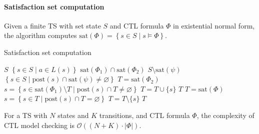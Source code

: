 \paragraph*{Satisfaction set computation}
Given a finite TS with set state $S$ and CTL formula $\Phi$ in existential normal form, the algorithm computes $\text{sat}(\Phi)=\left\{s\in S\mid s\models\Phi\right\}$.
\begin{algorithm}[H]
    \caption{Satisfaction set computation}
        \begin{algorithmic}[1]
            \Repeat     
                \Switch{$\Phi$}
                        \State \Return $S$
                    \EndCase
                        \State \Return $\left\{s\in S\mid a \in L(s)\right\}$
                    \EndCase
                        \State \Return $\text{sat}(\Phi_1)\cap\text{sat}(\Phi_2)$
                    \EndCase
                    \Case{$\lnot\psi$}
                        \State \Return $S\setminus\text{sat}(\psi)$
                    \EndCase
                    \Case{$\exists\circ\psi$}
                        \State \Return $\left\{s\in S\mid\text{post}(s)\cap\text{sat}(\psi)\neq\varnothing\right\}$
                    \EndCase
                        \State $T=\text{sat}(\Phi_2)$ 
                            \State $s= \left\{s\in\text{sat}(\Phi_1)\setminus T\mid\text{post}(s)\cap T\neq \varnothing\right\}$
                            \State $T=T\cup\{s\}$ 
                        \EndWhile 
                        \State \Return $T$
                    \EndCase
                    \Case{$\exists\Box\phi$}
                        \State $T=\text{sat}(\Phi)$ 
                            \State $s= \left\{s\in T\mid\text{post}(s)\cap T= \varnothing\right\}$
                            \State $T=T\setminus\{s\}$ 
                        \EndWhile 
                        \State \Return $T$
                    \EndCase
                \EndSwitch
        \end{algorithmic}
\end{algorithm}
\noindent For a TS with $N$ states and $K$ transitions, and CTL formula $\Phi$, the complexity of CTL model checking is $\mathcal{O}((N+K)\cdot\left\lvert \Phi\right\rvert )$.
